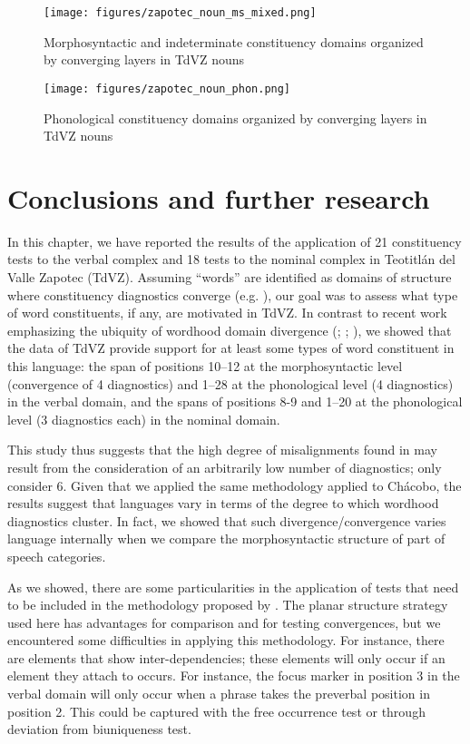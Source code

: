 \documentclass[output=paper]{langscibook}
\begin{document}
\begin{figure}
\texttt{[image: figures/zapotec\_noun\_ms\_mixed.png]}
\caption{Morphosyntactic and indeterminate constituency domains organized by converging layers in TdVZ nouns}
\label{fig:key:zap:5}
\end{figure}

\begin{figure}
\texttt{[image: figures/zapotec\_noun\_phon.png]}
\caption{Phonological constituency domains organized by converging layers in TdVZ nouns}
\label{fig:key:zap:6}
\end{figure}


\section{Conclusions and further research}\label{bkm:Ref83129350}
In this chapter, we have reported the results of the application of 21 constituency tests to the verbal complex and 18 tests to the nominal complex in Teotitlán del Valle Zapotec (TdVZ). Assuming ``words'' are identified as domains of structure where constituency diagnostics converge (e.g. \citealt{Matthews2002}), our goal was to assess what type of word constituents, if any, are motivated in TdVZ. In contrast to recent work emphasizing the ubiquity of wordhood domain divergence (\citealt{Haspelmath2011}; \citealt{Bickel2017}; \citealt{Tallman2021}), we showed that the data of TdVZ provide support for at least some types of word constituent in this language: the span of positions 10–12 at the morphosyntactic level (convergence of 4 diagnostics) and 1–28 at the phonological level (4 diagnostics) in the verbal domain, and the spans of positions 8-9 and 1–20 at the phonological level (3 diagnostics each) in the nominal domain.


This study thus suggests that the high degree of misalignments found in \citet{Bickel2017} may result from the consideration of an arbitrarily low number of diagnostics; \citet{Bickel2017} only consider 6. Given that we applied the same methodology \citet{Tallman2021} applied to Chácobo, the results suggest that languages vary in terms of the degree to which wordhood diagnostics cluster. In fact, we showed that such divergence/convergence varies language internally when we compare the morphosyntactic structure of part of speech categories. 

As we showed, there are some particularities in the application of tests that need to be included in the methodology proposed by \citet{Tallman2020}. The planar structure strategy used here has advantages for comparison and for testing convergences, but we encountered some difficulties in applying this methodology. For instance, there are elements that show inter-dependencies; these elements will only occur if an element they attach to occurs. For instance, the focus marker in position 3 in the verbal domain will only occur when a phrase takes the preverbal position in position 2. This could be captured with the free occurrence test or through deviation from biuniqueness test.
\end{document}
